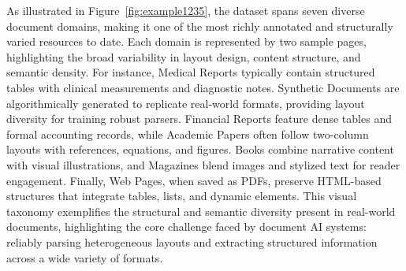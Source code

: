  

As illustrated in Figure~\ref{fig:example1235}, the dataset spans seven diverse document domains, making it one of the most richly annotated and structurally varied resources to date. Each domain is represented by two sample pages, highlighting the broad variability in layout design, content structure, and semantic density. For instance, Medical Reports typically contain structured tables with clinical measurements and diagnostic notes. Synthetic Documents are algorithmically generated to replicate real-world formats, providing layout diversity for training robust parsers. Financial Reports feature dense tables and formal accounting records, while Academic Papers often follow two-column layouts with references, equations, and figures. Books combine narrative content with visual illustrations, and Magazines blend images and stylized text for reader engagement. Finally, Web Pages, when saved as PDFs, preserve HTML-based structures that integrate tables, lists, and dynamic elements. This visual taxonomy exemplifies the structural and semantic diversity present in real-world documents, highlighting the core challenge faced by document AI systems: reliably parsing heterogeneous layouts and extracting structured information across a wide variety of formats.







